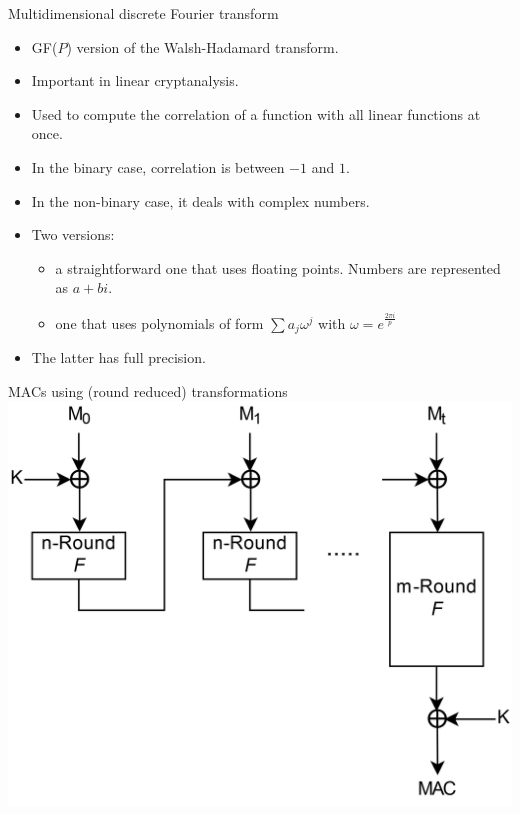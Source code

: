 \documentclass{beamer}
\begin{document}
\begin{frame}{Multidimensional discrete Fourier transform}
\begin{itemize}
    \item GF($P$) version of the Walsh-Hadamard transform.
    \item Important in linear cryptanalysis.
    \item Used to compute the correlation of a function with all linear functions at once.
    \item In the binary case, correlation is between $-1$ and $1$.
    \item In the non-binary case, it deals with complex numbers.
    \item Two versions: 
    \begin{itemize}
        \item a straightforward one that uses floating points. Numbers are represented as $a + bi$. 
        \item one that uses polynomials of form $\sum a_j\omega^j$ with $\omega = e^{\frac{2\pi i}{p}}$
    \end{itemize} 
    \item The latter has full precision.
\end{itemize}
\end{frame}

\begin{frame}{MACs using (round reduced) transformations}
\centering\includegraphics[scale=0.12]{HMAC_HighResV2.png}
\end{frame}
\end{document}
